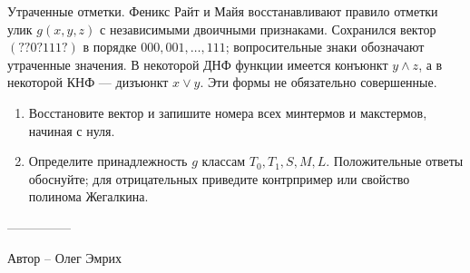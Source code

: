 \question
Утраченные отметки. Феникс Райт и Майя восстанавливают правило отметки улик $g(x,y,z)$ с независимыми двоичными признаками. Сохранился вектор $(??0?111?)$ в порядке $000,001,\ldots,111$; вопросительные знаки обозначают утраченные значения. В некоторой ДНФ функции имеется конъюнкт $y\land z$, а в некоторой КНФ --- дизъюнкт $x\lor y$. Эти формы не обязательно совершенные.
\begin{enumerate}
\item Восстановите вектор и запишите номера всех минтермов и макстермов, начиная с нуля.
\item Определите принадлежность $g$ классам $T_0,T_1,S,M,L$. Положительные ответы обоснуйте; для отрицательных приведите контрпример или свойство полинома Жегалкина.
\end{enumerate}

---------------

Автор -- Олег Эмрих
